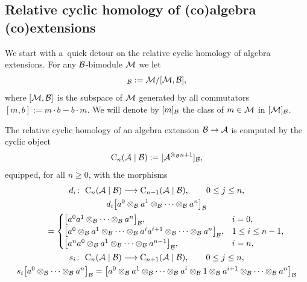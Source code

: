 \subsection{Relative cyclic homology of (co)algebra (co)extensions}

We start with a~quick detour on the relative cyclic homology of algebra extensions.
For any ${\cal B}$-bimodule ${\cal M}$ we let
\begin{gather*}
[{\cal M}]_{\cal B}:={\cal M}/[{\cal M},{\cal B}],
\end{gather*}
where $[{\cal M},{\cal B}]$ is the subspace of ${\cal M}$ generated by all commutators $[m,b]:=m\cdot b-b\cdot m$.
We will denote by $[m]_{\cal B}$ the class of $m\in {\cal M}$ in $[{\cal M}]_{\cal B}$.

The relative cyclic homology of an algebra extension ${\cal B}\rightarrow {\cal A}$ is computed by the cyclic object
\begin{gather}
\label{aux-rel-cyclic-alg}
{\rm C}_n({\cal A}\mid{\cal B}):=[{\cal A}^{\otimes_{\cal B} n+1}]_{\cal B},
\end{gather}
equipped, for all $n\geq 0$, with the morphisms
\begin{gather*}%
d_i\colon \ {\rm C}_n({\cal A}\mid{\cal B}) \longrightarrow {\rm C}_{n-1}({\cal A}\mid{\cal B}),
\qquad
0 \leq j \leq n,
\\
d_i\big[a^0 \otimes_{\cal B} a^1 \otimes_{\cal B} \dots \otimes_{\cal B} a^n\big]_{\cal B}\\
\qquad{}
=\begin{cases}
\big[a^0 a^1 \otimes_{\cal B} \dots \otimes_{\cal B} a^n \big]_{\cal B}, & i =0,
\\
\big[a^0 \otimes_{\cal B} a^1 \otimes_{\cal B} \dots \otimes_{\cal B} a^i a^{i+1} \otimes_{\cal B} \dots \otimes_{\cal B} a^n \big]_{\cal B},& 1\leq i\leq n-1,
\\
\big[a^n a^0 \otimes_{\cal B} a^1 \otimes_{\cal B} \dots \otimes_{\cal B} a^{n-1}\big]_{\cal B}, & i =n,
\end{cases}
\\
s_i\colon \ {\rm C}_n({\cal A}\mid{\cal B}) \longrightarrow {\rm C}_{n+1}({\cal A}\mid{\cal B}),
\qquad
0 \leq j \leq n,
\\
s_i\big[a^0 \otimes_{\cal B} \dots \otimes_{\cal B} a^n\big]_{\cal B} =\big[a^0 \otimes_{\cal B} a^1
\otimes_{\cal B} \dots \otimes_{\cal B} a^i \otimes_{\cal B} 1 \otimes_{\cal B} a^{i+1} \otimes_{\cal B} \dots
\otimes_{\cal B} a^n \big]_{\cal B}
\end{gather*}
